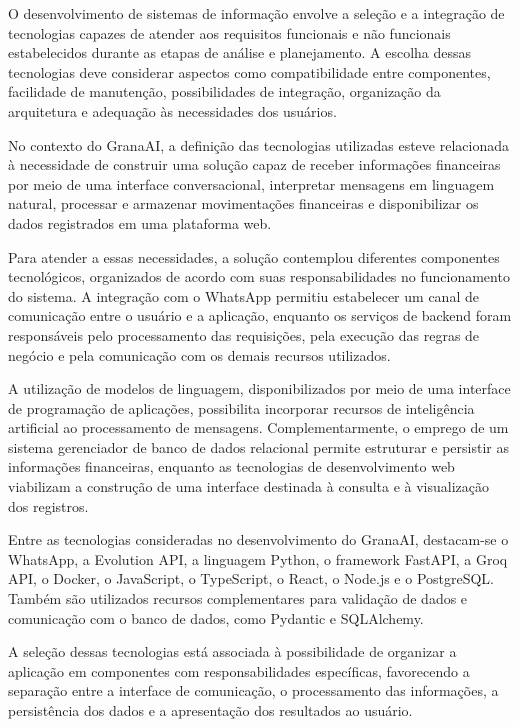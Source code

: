 O desenvolvimento de sistemas de informação envolve a seleção e a integração de tecnologias capazes de atender aos requisitos funcionais e não funcionais estabelecidos durante as etapas de análise e planejamento. A escolha dessas tecnologias deve considerar aspectos como compatibilidade entre componentes, facilidade de manutenção, possibilidades de integração, organização da arquitetura e adequação às necessidades dos usuários.

No contexto do GranaAI, a definição das tecnologias utilizadas esteve relacionada à necessidade de construir uma solução capaz de receber informações financeiras por meio de uma interface conversacional, interpretar mensagens em linguagem natural, processar e armazenar movimentações financeiras e disponibilizar os dados registrados em uma plataforma web.

Para atender a essas necessidades, a solução contemplou diferentes componentes tecnológicos, organizados de acordo com suas responsabilidades no funcionamento do sistema. A integração com o WhatsApp permitiu estabelecer um canal de comunicação entre o usuário e a aplicação, enquanto os serviços de backend foram responsáveis pelo processamento das requisições, pela execução das regras de negócio e pela comunicação com os demais recursos utilizados.

A utilização de modelos de linguagem, disponibilizados por meio de uma interface de programação de aplicações, possibilita incorporar recursos de inteligência artificial ao processamento de mensagens. Complementarmente, o emprego de um sistema gerenciador de banco de dados relacional permite estruturar e persistir as informações financeiras, enquanto as tecnologias de desenvolvimento web viabilizam a construção de uma interface destinada à consulta e à visualização dos registros.

Entre as tecnologias consideradas no desenvolvimento do GranaAI, destacam-se o WhatsApp, a Evolution API, a linguagem Python, o framework FastAPI, a Groq API, o Docker, o JavaScript, o TypeScript, o React, o Node.js e o PostgreSQL. Também são utilizados recursos complementares para validação de dados e comunicação com o banco de dados, como Pydantic e SQLAlchemy.

A seleção dessas tecnologias está associada à possibilidade de organizar a aplicação em componentes com responsabilidades específicas, favorecendo a separação entre a interface de comunicação, o processamento das informações, a persistência dos dados e a apresentação dos resultados ao usuário.

